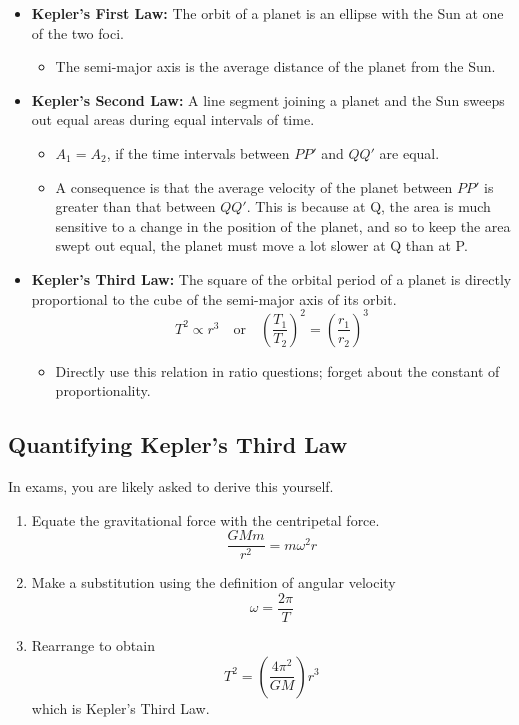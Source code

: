 \documentclass[a4paper,12pt]{article}
\newcommand{\paren}[1]{\left(#1\right)}
\begin{document}
\begin{itemize}
  \item \textbf{Kepler's First Law:} The orbit of a planet is an ellipse with the Sun at one of the two foci.
        \begin{itemize}
          \item The semi-major axis is the average distance of the planet from the Sun.
        \end{itemize}
  \item \textbf{Kepler's Second Law:} A line segment joining a planet and the Sun sweeps out equal areas during equal intervals of time.
        \begin{itemize}
          \item $A_1 = A_2$, if the time intervals between $PP'$ and $QQ'$ are equal.
          \item A consequence is that the average velocity of the planet between $PP'$ is greater than that between $QQ'$. This is because at Q, the area is much sensitive to a change in the position of the planet, and so to keep the area swept out equal, the planet must move a lot slower at Q than at P.
        \end{itemize}
  \item \textbf{Kepler's Third Law:} The square of the orbital period of a planet is directly proportional to the cube of the semi-major axis of its orbit. $$T^2 \propto r^3 \quad\text{or}\quad \left(\frac{T_1}{T_2}\right)^2 = \left(\frac{r_1}{r_2}\right)^3$$
        \begin{itemize}
          \item Directly use this relation in ratio questions; forget about the constant of proportionality.
        \end{itemize}
\end{itemize}

\subsection{Quantifying Kepler's Third Law}

In exams, you are likely asked to derive this yourself.
\begin{enumerate}
  \item Equate the gravitational force with the centripetal force.
        $$\frac{GMm}{r^2} = m\omega^2r$$
  \item Make a substitution using the definition of angular velocity
        $$\omega = \frac{2\pi}{T}$$

  \item Rearrange to obtain \begin{equation}\label{eq:kepler}
          T^2 = \paren{\frac{4\pi^2}{GM}}r^3\end{equation}
        which is Kepler's Third Law.
\end{enumerate}
\end{document}
